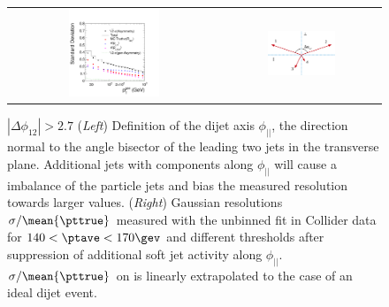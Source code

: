 \begin{figure}[ht]
  \label{fig:ResFit:AddJets:Bias}
  \centering
  \begin{tabular}{cc}
    \includegraphics[width=0.45\textwidth]{figures/Spring10QCDDiJet_ParallelComponent_hParallelContributions} &
    \includegraphics[width=0.45\textwidth]{figures/Sketch_Projections}
  \end{tabular}
  \caption{\mbox{$|\Delta\phi_{12}| > 2.7$} (\textit{Left}) Definition of the dijet axis $\phi_{||}$, the direction normal to the
    angle bisector of the leading two jets in the transverse plane.
    Additional jets with \pt components along $\phi_{||}$ will cause
    a \pt imbalance of the particle jets and bias the measured
    resolution towards larger values.
    (\textit{Right}) Gaussian resolutions \mbox{$\sigma/\mean{\pttrue}$} measured with the unbinned
    fit in Collider data for \mbox{$140 < \ptave < 170\gev$} and different 
    thresholds after suppression of additional soft jet activity along
    $\phi_{||}$. 
    \mbox{$\sigma/\mean{\pttrue}$} on  is linearly
    extrapolated to the case of an ideal dijet event.
  }
\end{figure}

